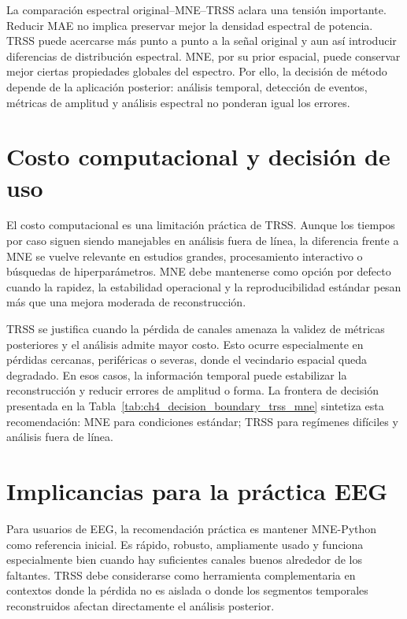 La comparación espectral original--MNE--TRSS aclara una tensión importante. Reducir MAE no implica preservar mejor la densidad espectral de potencia. TRSS puede acercarse más punto a punto a la señal original y aun así introducir diferencias de distribución espectral. MNE, por su prior espacial, puede conservar mejor ciertas propiedades globales del espectro. Por ello, la decisión de método depende de la aplicación posterior: análisis temporal, detección de eventos, métricas de amplitud y análisis espectral no ponderan igual los errores.

\section{Costo computacional y decisión de uso}

El costo computacional es una limitación práctica de TRSS. Aunque los tiempos por caso siguen siendo manejables en análisis fuera de línea, la diferencia frente a MNE se vuelve relevante en estudios grandes, procesamiento interactivo o búsquedas de hiperparámetros. MNE debe mantenerse como opción por defecto cuando la rapidez, la estabilidad operacional y la reproducibilidad estándar pesan más que una mejora moderada de reconstrucción.

TRSS se justifica cuando la pérdida de canales amenaza la validez de métricas posteriores y el análisis admite mayor costo. Esto ocurre especialmente en pérdidas cercanas, periféricas o severas, donde el vecindario espacial queda degradado. En esos casos, la información temporal puede estabilizar la reconstrucción y reducir errores de amplitud o forma. La frontera de decisión presentada en la Tabla~\ref{tab:ch4_decision_boundary_trss_mne} sintetiza esta recomendación: MNE para condiciones estándar; TRSS para regímenes difíciles y análisis fuera de línea.

\section{Implicancias para la práctica EEG}

Para usuarios de EEG, la recomendación práctica es mantener MNE-Python como referencia inicial. Es rápido, robusto, ampliamente usado y funciona especialmente bien cuando hay suficientes canales buenos alrededor de los faltantes. TRSS debe considerarse como herramienta complementaria en contextos donde la pérdida no es aislada o donde los segmentos temporales reconstruidos afectan directamente el análisis posterior.

